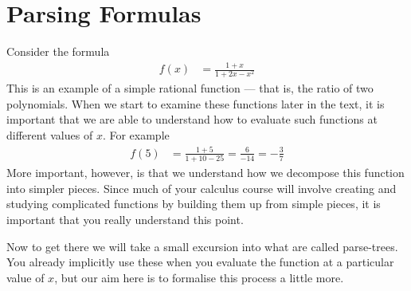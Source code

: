 \section{Parsing Formulas}
\label{sec parsing}
Consider the formula
\begin{align*}
  f(x) &= \frac{1+x}{1+2x-x^2}
\end{align*}
  This is an example of a simple rational function --- that is, the ratio of
two polynomials. When we start to examine these functions later in the text, it
is important that we are able to understand how to evaluate such functions at
different values of $x$. For example
\begin{align*}
  f(5) &= \frac{1+5}{1+10-25} = \frac{6}{-14} = -\frac{3}{7}
\end{align*}
More important, however, is that we understand how we decompose this function
into simpler pieces. Since much of your calculus course will involve creating and
studying complicated functions by building them up from simple pieces, it is important
that you really understand this point.


Now to get there we will take a small excursion into what are called
parse-trees. You already implicitly use these when you evaluate the function at
a particular value of $x$, but our aim here is to formalise this
process a little more.

